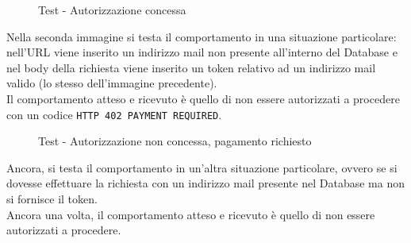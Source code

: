 \begin{figure}[H]
	\centering
	\caption{Test - Autorizzazione concessa}
	\label{fig:auth}
\end{figure}
Nella seconda immagine si testa il comportamento in una situazione particolare: nell'URL viene inserito un indirizzo mail non presente all'interno 
del Database e nel body della richiesta viene inserito un token relativo ad un indirizzo mail valido (lo stesso dell'immagine precedente).\\
Il comportamento atteso e ricevuto è quello di non essere autorizzati a procedere con un codice \texttt{HTTP 402 PAYMENT REQUIRED}.

\begin{figure}[H]
	\centering
	\caption{Test - Autorizzazione non concessa, pagamento richiesto}
	\label{fig:payment}
\end{figure}

Ancora, si testa il comportamento in un'altra situazione particolare, ovvero se si dovesse effettuare la richiesta con un indirizzo mail presente nel Database 
ma non si fornisce il token.\\
Ancora una volta, il comportamento atteso e ricevuto è quello di non essere autorizzati a procedere.

